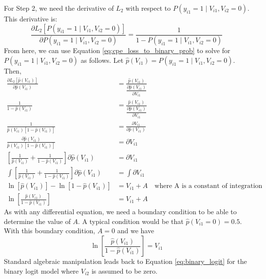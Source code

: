 For Step 2, we need the derivative of $L_2$ with respect to $P \left( y_{i1} = 1 \mid V_{i1}, V_{i2} = 0 \right)$. This derivative is:
\begin{equation*}
\frac{\partial L_2 \left[ P \left( y_{i1} = 1 \mid V_{i1}, V_{i2} = 0 \right) \right]}{\partial P \left( y_{i1} = 1 \mid V_{i1}, V_{i2} = 0 \right)} = \frac{1}{1 - P \left( y_{i1} = 1 \mid V_{i1}, V_{i2} = 0 \right)}
\end{equation*}
From here, we can use Equation \ref{eq:cpe_loss_to_binary_prob} to solve for $P \left( y_{i1} = 1 \mid V_{i1}, V_{i2} = 0 \right)$ as follows. Let $\hat{p} \left( V_{i1} \right) = P \left( y_{i1} = 1 \mid V_{i1}, V_{i2} = 0 \right)$. Then,
\begin{equation*}
\begin{aligned}
\frac{\partial L_2 \left[ \hat{p} \left( V_{i1} \right) \right]}{\partial \hat{p} \left( V_{i1} \right)} &= \frac{\hat{p} \left( V_{i1} \right)}{\dfrac{\partial \hat{p} \left( V_{i1} \right)}{\partial V_{i1}}} \\
\frac{1}{1 - \hat{p} \left( V_{i1} \right)} &= \frac{\hat{p} \left( V_{i1} \right)}{\dfrac{\partial \hat{p} \left( V_{i1} \right)}{\partial V_{i1}}} \\
\frac{1}{\hat{p} \left( V_{i1} \right) \left[ 1 - \hat{p} \left( V_{i1} \right) \right]} &= \frac{\partial V_{i1}}{\partial \hat{p} \left( V_{i1} \right)} \\
\frac{\partial \hat{p} \left( V_{i1} \right)}{\hat{p} \left( V_{i1} \right) \left[ 1 - \hat{p} \left( V_{i1} \right) \right]} &= \partial V_{i1} \\
\left[ \frac{1}{\hat{p} \left( V_{i1} \right)} + \frac{1}{1 - \hat{p} \left( V_{i1} \right)} \right]\partial \hat{p} \left( V_{i1} \right) &= \partial V_{i1} \\
\int \left[ \frac{1}{\hat{p} \left( V_{i1} \right)} + \frac{1}{1 - \hat{p} \left( V_{i1} \right)} \right]\partial \hat{p} \left( V_{i1} \right) &= \int \partial V_{i1} \\
\ln \left[ \hat{p} \left( V_{i1} \right) \right] - \ln \left[ 1 - \hat{p} \left( V_{i1} \right) \right] &= V_{i1} + A \quad \textrm{where A is a constant of integration} \\
\ln \left[ \frac{\hat{p} \left( V_{i1} \right)}{1 - \hat{p} \left( V_{i1} \right)} \right] &= V_{i1} + A 
\end{aligned}
\end{equation*}
As with any differential equation, we need a boundary condition to be able to determine the value of $A$. A typical condition would be that $\hat{p} \left( V_{i1} = 0 \right) = 0.5$. With this boundary condition, $A = 0$ and we have
\begin{equation*}
\ln \left[ \frac{\hat{p} \left( V_{i1} \right)}{1 - \hat{p} \left( V_{i1} \right)} \right] = V_{i1}
\end{equation*}
Standard algebraic manipulation leads back to Equation \ref{eq:binary_logit} for the binary logit model where $V_{i2}$ is assumed to be zero.


